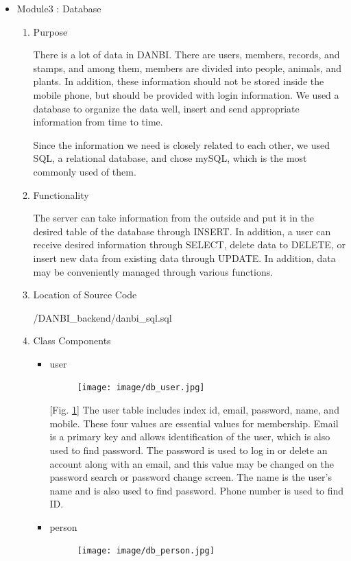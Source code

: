 \documentclass[conference]{IEEEtran}
\begin{document}
\begin{itemize}
    \item Module3 : Database
    \begin{enumerate}
    \setlength{\parindent}{2ex}
    \setlength{\parskip}{0.5em}
        \item Purpose
        
        There is a lot of data in DANBI. There are users, members, records, and stamps, and among them, members are divided into people, animals, and plants. In addition, these information should not be stored inside the mobile phone, but should be provided with login information. We used a database to organize the data well, insert and send appropriate information from time to time.

        Since the information we need is closely related to each other, we used SQL, a relational database, and chose mySQL, which is the most commonly used of them.
        \item Functionality
        
        The server can take information from the outside and put it in the desired table of the database through INSERT. In addition, a user can receive desired information through SELECT, delete data to DELETE, or insert new data from existing data through UPDATE. In addition, data may be conveniently managed through various functions.
        \item Location of Source Code
        
        /DANBI\_backend/danbi\_sql.sql
        \item Class Components
        \begin{itemize}
            \item user
            \setlength{\parindent}{2ex}
            \par \begin{figure}[h!]
            \texttt{[image: image/db\_user.jpg]}
            \centering
            \caption{}
            \label{fig:db_user}
            \end{figure}
            
            [Fig. \ref{fig:db_user}] The user table includes index id, email, password, name, and mobile. These four values are essential values for membership. Email is a primary key and allows identification of the user, which is also used to find password. The password is used to log in or delete an account along with an email, and this value may be changed on the password search or password change screen. The name is the user's name and is also used to find password. Phone number is used to find ID.
            \item person
            \setlength{\parindent}{2ex}
            \par \begin{figure}[h!]
            \texttt{[image: image/db\_person.jpg]}
            \centering
            \caption{}
            \label{fig:db_person}
            \end{figure}
            

\end{itemize}
\end{enumerate}
\end{itemize}
\end{document}
